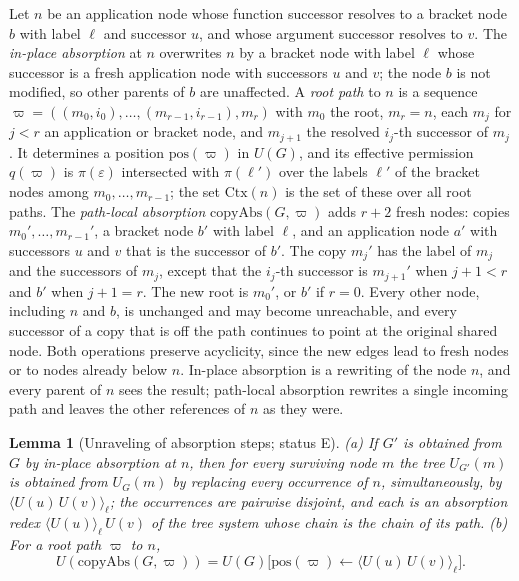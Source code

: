 \documentclass[11pt]{article}
\newtheorem{lemma}[theorem]{Lemma}
\theoremstyle{definition}
\theoremstyle{remark}
\newcommand{\br}[2]{\langle #1\rangle_{#2}}
\newcommand{\Ctx}{\mathrm{Ctx}}
\newcommand{\Et}{status E}
\begin{document}
Let $n$ be an application node whose function successor resolves to a bracket node $b$ with label $\ell$ and successor $u$, and whose argument successor resolves to $v$. The \emph{in-place absorption} at $n$ overwrites $n$ by a bracket node with label $\ell$ whose successor is a fresh application node with successors $u$ and $v$; the node $b$ is not modified, so other parents of $b$ are unaffected. A \emph{root path} to $n$ is a sequence $\varpi=((m_0,i_0),\dots,(m_{r-1},i_{r-1}),m_r)$ with $m_0$ the root, $m_r=n$, each $m_j$ for $j<r$ an application or bracket node, and $m_{j+1}$ the resolved $i_j$-th successor of $m_j$. It determines a position $\mathrm{pos}(\varpi)$ in $U(G)$, and its effective permission $q(\varpi)$ is $\pi(\varepsilon)$ intersected with $\pi(\ell')$ over the labels $\ell'$ of the bracket nodes among $m_0,\dots,m_{r-1}$; the set $\Ctx(n)$ is the set of these over all root paths. The \emph{path-local absorption} $\mathrm{copyAbs}(G,\varpi)$ adds $r+2$ fresh nodes: copies $m_0',\dots,m_{r-1}'$, a bracket node $b'$ with label $\ell$, and an application node $a'$ with successors $u$ and $v$ that is the successor of $b'$. The copy $m_j'$ has the label of $m_j$ and the successors of $m_j$, except that the $i_j$-th successor is $m_{j+1}'$ when $j+1<r$ and $b'$ when $j+1=r$. The new root is $m_0'$, or $b'$ if $r=0$. Every other node, including $n$ and $b$, is unchanged and may become unreachable, and every successor of a copy that is off the path continues to point at the original shared node. Both operations preserve acyclicity, since the new edges lead to fresh nodes or to nodes already below $n$. In-place absorption is a rewriting of the node $n$, and every parent of $n$ sees the result; path-local absorption rewrites a single incoming path and leaves the other references of $n$ as they were.

\begin{lemma}[Unraveling of absorption steps; \Et]\label{lem:unravelabs}
(a) If $G'$ is obtained from $G$ by in-place absorption at $n$, then for every surviving node $m$ the tree $U_{G'}(m)$ is obtained from $U_G(m)$ by replacing every occurrence of $n$, simultaneously, by $\br{U(u)\,U(v)}\ell$; the occurrences are pairwise disjoint, and each is an absorption redex $\br{U(u)}\ell\,U(v)$ of the tree system whose chain is the chain of its path. (b) For a root path $\varpi$ to $n$,
\[
U(\mathrm{copyAbs}(G,\varpi))=U(G)\bigl[\mathrm{pos}(\varpi)\leftarrow\br{U(u)\,U(v)}\ell\bigr].
\]
\end{lemma}
\end{document}
